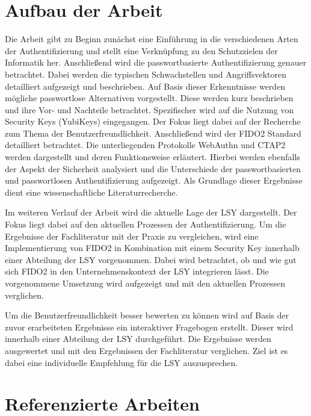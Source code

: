\section{Aufbau der Arbeit}
Die Arbeit gibt zu Beginn zunächst eine Einführung in die verschiedenen Arten der Authentifizierung und stellt eine Verknüpfung zu den Schutzzielen der Informatik her. Anschließend wird die passwortbasierte Authentifizierung genauer betrachtet. Dabei werden die typischen Schwachstellen und Angriffsvektoren detailliert aufgezeigt und beschrieben. Auf Basis dieser Erkenntnisse werden mögliche passwortlose Alternativen vorgestellt. Diese werden kurz beschrieben und ihre Vor- und Nachteile betrachtet. Spezifischer wird auf die Nutzung von Security Keys (YubiKeys) eingegangen. Der Fokus liegt dabei auf der Recherche zum Thema der Benutzerfreundlichkeit. Anschließend wird der \ac{FIDO}2 Standard detailliert betrachtet. Die unterliegenden Protokolle WebAuthn und \ac{CTAP2} werden dargestellt und deren Funktionsweise erläutert. Hierbei werden ebenfalls der Aspekt der Sicherheit analysiert und die Unterschiede der passwortbasierten und passwortlosen Authentifizierung aufgezeigt. Als Grundlage dieser Ergebnisse dient eine wissenschaftliche Literaturrecherche.

Im weiteren Verlauf der Arbeit wird die aktuelle Lage der \ac{LSY} dargestellt. Der Fokus liegt dabei auf den aktuellen Prozessen der Authentifizierung. Um die Ergebnisse der Fachliteratur mit der Praxis zu vergleichen, wird eine Implementierung von \ac{FIDO}2 in Kombination mit einem Security Key innerhalb einer Abteilung der \ac{LSY} vorgenommen. Dabei wird betrachtet, ob und wie gut sich \ac{FIDO}2 in den Unternehmenskontext der \ac{LSY} integrieren lässt. Die vorgenommene Umsetzung wird aufgezeigt und mit den aktuellen Prozessen verglichen.

Um die Benutzerfreundlichkeit besser bewerten zu können wird auf Basis der zuvor erarbeiteten Ergebnisse ein interaktiver Fragebogen erstellt. Dieser wird innerhalb einer Abteilung der \ac{LSY} durchgeführt. Die Ergebnisse werden ausgewertet und mit den Ergebnissen der Fachliteratur verglichen. Ziel ist es dabei eine individuelle Empfehlung für die \ac{LSY} auszusprechen.

\section{Referenzierte Arbeiten}

